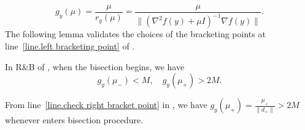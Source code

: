 \documentclass[moor,sglanonrev]{informs4}
\begin{document}
\begin{equation}
    \label{eq.auxiliary function for bisection}
    g_y(\mu) =\frac{\mu}{r_y(\mu)}=\frac{\mu}{\| (\nabla^2 f(y)+\mu I)^{-1}\nabla f(y)\|}.
\end{equation}
The following lemma validates the choices of the bracketing points at line~\ref{line.left bracketing point} of .
\begin{lemma}
    \label{lem.valid bracketing}
    In \textnormal{R\&B} of , when the bisection begins, we have
    \begin{equation*}
        g_y(\mu_-) < M, \quad g_y(\mu_+) >2M.
    \end{equation*}
\end{lemma}
From line~\ref{line.check right bracket point} in , we have $g_y(\mu_+)=\frac{\mu_+}{\|d_+\|} >2M$ whenever  enters bisection procedure.
\end{document}
